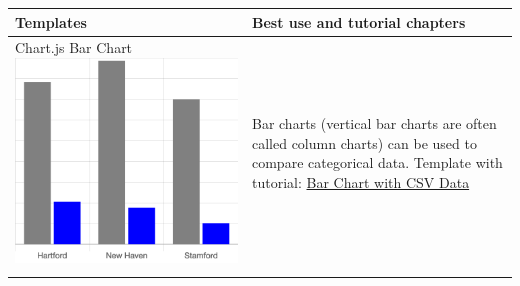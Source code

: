 \documentclass[
  english,
]{book}
\begin{document}
\begin{longtable}[]{@{}ll@{}}
\toprule
\begin{minipage}[b]{0.47\columnwidth}\raggedright
Templates\strut
\end{minipage} & \begin{minipage}[b]{0.47\columnwidth}\raggedright
Best use and tutorial chapters\strut
\end{minipage}\tabularnewline
\midrule
\endhead
\begin{minipage}[t]{0.47\columnwidth}\raggedright
Chart.js Bar Chart \includegraphics{images/12-chartjs/chartjs-bar.png}\strut
\end{minipage} & \begin{minipage}[t]{0.47\columnwidth}\raggedright
Bar charts (vertical bar charts are often called column charts) can be used to compare categorical data. Template with tutorial: \href{bar-chart-with-csv-data}{Bar Chart with CSV Data}\strut
\end{minipage}\tabularnewline
\begin{minipage}[t]{0.47\columnwidth}\raggedright

\end{minipage}
\end{longtable}
\end{document}
